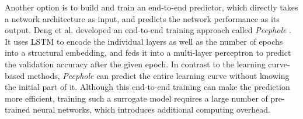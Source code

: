 \documentclass[journal]{IEEEtran}
\begin{document}
Another option is to build and train an end-to-end predictor, which directly takes a network architecture as input, and predicts the network performance as its output.  Deng et al. developed an end-to-end training approach called \textit{Peephole} \cite{deng2017peephole}. It uses LSTM to encode the individual layers as well as the number of epochs into a structural embedding, and feds it into a multi-layer perceptron to predict the validation accuracy after the given epoch. In contrast to the learning curve-based methods, \textit{Peephole} can predict the entire learning curve without knowing the initial part of it. Although this end-to-end training can make the prediction more efficient, training such a surrogate model requires a large number of pre-trained neural networks, which introduces additional computing overhead.
\end{document}
